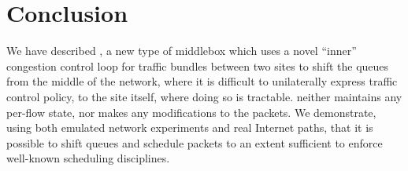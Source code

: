\section{Conclusion}\label{s:concl}
We have described \name, a new type of middlebox which uses a novel ``inner''  congestion control loop for traffic bundles between two sites to shift the queues from the middle of the network, where it is difficult to unilaterally express traffic control policy, to the site itself, where doing so is tractable. 
\name neither maintains any per-flow state, nor makes any modifications to the packets. 
We demonstrate, using both emulated network experiments and real Internet paths, that it is possible to shift queues and schedule packets to an extent sufficient to enforce well-known scheduling disciplines. 



